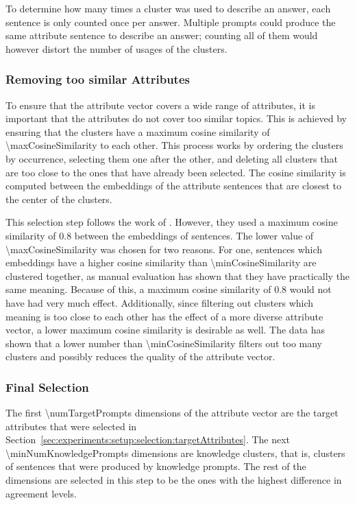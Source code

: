 To determine how many times a cluster was used to describe an answer, each sentence is only counted once per answer. Multiple prompts could produce the same attribute sentence to describe an answer; counting all of them would however distort the number of usages of the clusters.

\subsubsection{Removing too similar Attributes}
\label{sec:experiments:setup:selection:removeSimilar}
To ensure that the attribute vector covers a wide range of attributes, it is important that the attributes do not cover too similar topics. This is achieved by ensuring that the clusters have a maximum cosine similarity of \num{\maxCosineSimilarity} to each other. This process works by ordering the clusters by occurrence, selecting them one after the other, and deleting all clusters that are too close to the ones that have already been selected.
The cosine similarity is computed between the embeddings of the attribute sentences that are closest to the center of the clusters.

This selection step follows the work of \citet{patelLearningInterpretableStyle2023}. However, they used a maximum cosine similarity of \num{0.8} between the embeddings of sentences. The lower value of \num{\maxCosineSimilarity} was chosen for two reasons. For one, sentences which embeddings have a higher cosine similarity than \num{\minCosineSimilarity} are clustered together, as manual evaluation has shown that they have practically the same meaning. Because of this, a maximum cosine similarity of \num{0.8} would not have had very much effect. Additionally, since filtering out clusters which meaning is too close to each other has the effect of a more diverse attribute vector, a lower maximum cosine similarity is desirable as well. The data has shown that a lower number than \num{\minCosineSimilarity} filters out too many clusters and possibly reduces the quality of the attribute vector.


\subsubsection{Final Selection}
\label{sec:experiments:setup:selection:finalSelection}
The first \num{\numTargetPrompts} dimensions of the attribute vector are the target attributes that were selected in Section~\ref{sec:experiments:setup:selection:targetAttributes}. The next \num{\minNumKnowledgePrompts} dimensions are knowledge clusters, that is, clusters of sentences that were produced by knowledge prompts. The rest of the dimensions are selected in this step to be the ones with the highest difference in agreement levels.

